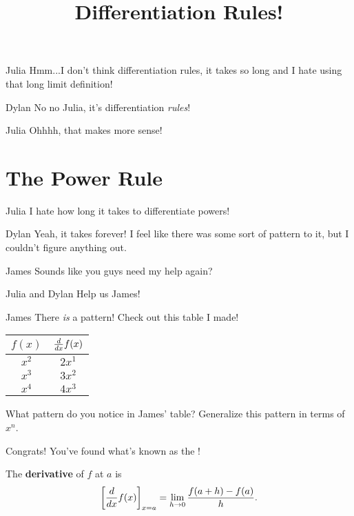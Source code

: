 \documentclass{ximera}
\title{Differentiation Rules!}
\begin{document}
\maketitle
\begin{dialogue}
\item[Julia] Hmm...I don't think differentiation rules, it takes so long and I hate using that long limit definition!
\item[Dylan] No no Julia, it's differentiation \textit{rules}!
\item[Julia] Ohhhh, that makes more sense!

\end{dialogue}
\section{The Power Rule}
\begin{dialogue}
\item[Julia] I hate how long it takes to differentiate powers!
\item[Dylan] Yeah, it takes forever! I feel like there was some sort of pattern to it, but I couldn't figure anything out.
\item[James] Sounds like you guys need my help again?
\item[Julia and Dylan] Help us James!
\item[James] There \textit{is} a pattern! Check out this table I made!
\begin{center}
\begin{tabular}{c|c}
$f(x)$ & $\frac{d}{\mathop{}\!d x} f(x)$ \\
\hline
$x^2$ & $2x^1$ \\
$x^3$ & $3x^2$ \\
$x^4$ & $4x^3$
\end{tabular}
\end{center}
\end{dialogue}
\begin{question}
What pattern do you notice in James' table? Generalize this pattern in terms of $x^n$.
\begin{multipleChoice}
\end{multipleChoice}
\begin{feedback}[correct]
Congrats! You've found what's known as the !
\end{feedback}
\end{question}

\begin{definition}
  The \textbf{derivative} of $f$ at $a$ is
  \[
  \bigg[ \frac{d}{dx} f(x) \bigg]_{x=a} = \lim_{h\to 0} \frac{f(a+h) - f(a)}{h}.
  \]
\end{definition}
\end{document}
